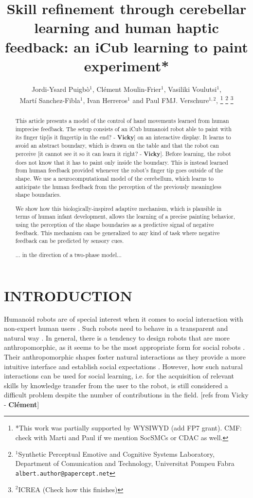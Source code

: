 \documentclass[letterpaper, 10 pt, conference]{ieeeconf}  %
\title{\LARGE \bf
Skill refinement through cerebellar learning and human haptic feedback:
an iCub learning to paint experiment*
}
\author{Jordi-Ysard Puigb\`o$^{1}$, Cl\'{e}ment Moulin-Frier$^{1}$, Vasiliki Voulutsi$^{1}$,\\ Mart\'i Sanchez-Fibla$^{1}$, Ivan Herreros$^{1}$ and Paul FMJ. Verschure$^{1,2}$, %
\thanks{*This work was partially supported by WYSIWYD (add FP7 grant). CMF: check with Marti and Paul if we mention SocSMCs or CDAC as well. }%
\thanks{$^{1}$Synthetic Perceptual Emotive and Cognitive Systems Laboratory, Department of Comunication and Technology, Universitat Pompeu Fabra
        {\tt\small albert.author@papercept.net}}%
\thanks{$^{2}$ICREA (Check how this finishes)
        }%
}
\newcommand\cmf[1]{{\footnotesize \color{red}[#1 - \textbf{Cl\'ement}]}} %
\newcommand\vv[1]{{\color{red}}{\color{red}}{\footnotesize \color{red}[#1 - \textbf{Vicky}]}} %
\begin{document}
\maketitle
\thispagestyle{empty}
\pagestyle{empty}


\begin{abstract}
This article presents a model of the control of hand movements learned from human imprecise feedback. 
The setup consists of an iCub humanoid robot able to paint with its finger tip\vv{is it fingertip in the end?} on an interactive display. It learns to avoid an abstract boundary, which is drawn on the table and that the robot can perceive \vv{it cannot see it so it can learn it right?}. Before learning, the robot does not know that it has to paint only inside the boundary. This is instead learned from human feedback provided whenever the robot’s finger tip goes outside of the shape. We use a neurocomputational model of the cerebellum, which learns to anticipate the human feedback from the perception of the previously meaningless shape boundaries. 

We show how this biologically-inspired adaptive mechanism, which is plausible in terms of human infant development, allows the learning of a precise painting behavior, using the perception of the shape boundaries as a predictive signal of negative feedback. This mechanism can be generalized to any kind of task where negative feedback can be predicted by sensory cues.

... in the direction of a two-phase model...


\end{abstract}



\section{INTRODUCTION}

Humanoid robots are of special interest when it comes to social interaction with non-expert human users \cite{goodrich2007human}. Such robots need to behave in a transparent and natural way \cite{breazeal2009role}. In general, there is a tendency to design robots that are more anthropomorphic, as it seems to be the most appropriate form for social robots \cite{disalvo2002all}. Their anthropomorphic shapes foster natural interactions as they provide a more intuitive interface and establish social expectations \cite{duffy2003anthropomorphism}. However, how such natural interactions can be used for social learning, i.e. for the acquisition of relevant skills by knowledge transfer from the user to the robot, is still considered a difficult problem despite the number of contributions in the field. \cmf{refs from Vicky}
\end{document}
